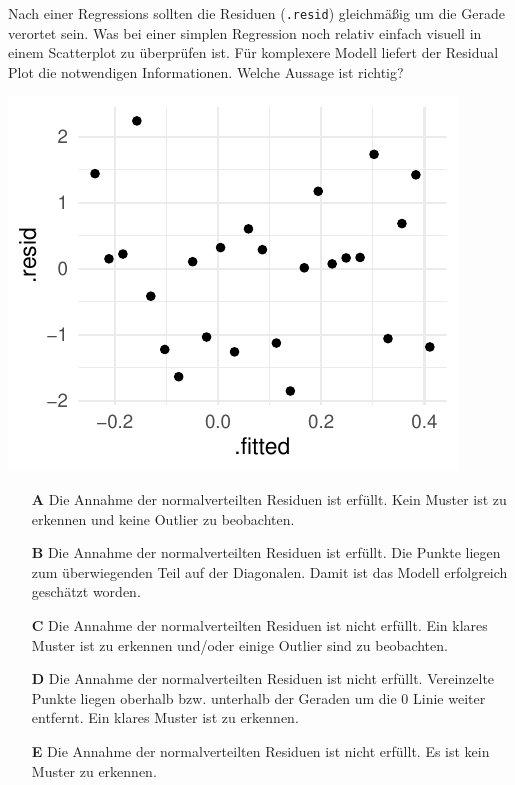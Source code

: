\documentclass[a4paper, 9pt]{scrartcl}\usepackage[]{graphicx}\usepackage[]{xcolor}
\makeatletter
\def\maxwidth{ %
  \ifdim\Gin@nat@width>\linewidth
    \linewidth
  \else
    \Gin@nat@width
  \fi
}
\makeatother
\begin{document}
Nach einer Regressions sollten die Residuen (\texttt{.resid}) gleichmäßig um die Gerade verortet sein. Was bei einer simplen Regression noch relativ einfach visuell in einem Scatterplot zu überprüfen ist. Für komplexere Modell liefert der Residual Plot die notwendigen Informationen. Welche Aussage ist richtig?



{\centering \includegraphics[width=\maxwidth]{img/mc-regression-06-a-1} 

}







\begin{enumerate}
\item [\textbf{A} \msquare] Die Annahme der normalverteilten Residuen ist erfüllt. Kein Muster ist zu erkennen und keine Outlier zu beobachten.
\item [\textbf{B} \msquare] Die Annahme der normalverteilten Residuen ist erfüllt. Die Punkte liegen zum überwiegenden Teil auf der Diagonalen. Damit ist das Modell erfolgreich geschätzt worden.
\item [\textbf{C} \msquare] Die Annahme der normalverteilten Residuen ist nicht erfüllt. Ein klares Muster ist zu erkennen und/oder einige Outlier sind zu beobachten.
\item [\textbf{D} \msquare] Die Annahme der normalverteilten Residuen ist nicht erfüllt. Vereinzelte Punkte liegen oberhalb bzw. unterhalb der Geraden um die 0 Linie weiter entfernt. Ein klares Muster ist zu erkennen.
\item [\textbf{E} \msquare] Die Annahme der normalverteilten Residuen ist nicht erfüllt. Es ist kein Muster zu erkennen.
\end{enumerate}
\end{document}
